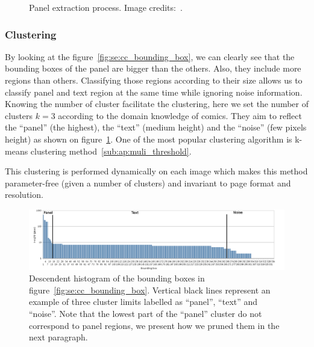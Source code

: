 \begin{figure}
		  \caption[Panel extraction process]{Panel extraction process. Image credits:~\cite{Bubble09}.}
	\end{figure}




\subsubsection{Clustering} %
\label{par:clustering}
By looking at the figure~\ref{fig:se:cc_bounding_box}, we can clearly see that the bounding boxes of the panel are bigger than the others.
Also, they include more regions than others.
Classifying those regions according to their size allows us to classify panel and text region at the same time while ignoring noise information.
Knowing the number of cluster facilitate the clustering, here 
we set the number of clusters $k=3$ according to the domain knowledge of comics.
They aim to reflect the ``panel'' (the highest), the ``text'' (medium height) and the ``noise'' (few pixels height) as shown on figure~\ref{fig:se:histo_roi}.
One of the most popular clustering algorithm is k-means clustering method~\ref{sub:ap:muli_threshold}.


This clustering is performed dynamically on each image which makes this method parameter-free (given a number of clusters) and invariant to page format and resolution.

	\begin{figure}[!ht]	%
	  \centering
		\includegraphics[trim= 5mm 0mm 10mm 0mm, clip,width=1.0\textwidth]{Histogram_en.png}
		\caption[Descendant histogram of the connected component bounding box heights]{Descendent histogram of the bounding boxes in figure~\ref{fig:se:cc_bounding_box}. Vertical black lines represent an example of three cluster limits labelled as ``panel'', ``text'' and ``noise''. Note that the lowest part of the ``panel'' cluster do not correspond to panel regions, we present how we pruned them in the next paragraph.}
		\label{fig:se:histo_roi}
	\end{figure}

